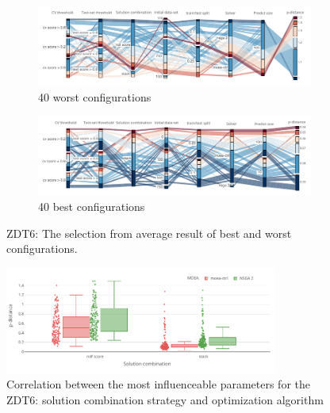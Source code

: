     \begin{figure}
        \centering
        \begin{subfigure}{\textwidth}
            \includegraphics[width=\textwidth]{content/images/conf_zdt6_worst}
            \caption{40 worst configurations}
            \label{fig:conf_zdt6_worst}
        \end{subfigure} 
        
        \begin{subfigure}{\textwidth}
            \includegraphics[width=\textwidth]{content/images/conf_zdt6_best}
            \caption{40 best configurations}
            \label{fig:conf_zdt6_best}
        \end{subfigure} 

        \caption[ZDT6: The selection from average result of best and worst configurations.]{ZDT6: The selection from average result of best and worst configurations.}
        \label{fig:conf_zdt6}    
    \end{figure}

    \begin{figure}
        \centering

        \includegraphics[width=0.8\textwidth]{content/images/conf_zdt6_solver}

        \caption[Correlation between the most influenceable parameters for the ZDT6]{Correlation between the most influenceable parameters for the ZDT6: solution combination strategy and optimization algorithm}
        \label{fig:conf_zdt6_sign}    
    \end{figure}


